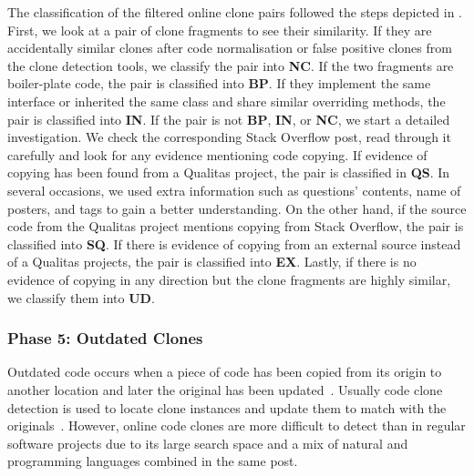 \documentclass[10pt,journal,compsoc]{IEEEtran}
\begin{document}
The classification of the filtered online clone pairs followed the steps
depicted in . First, we look at a pair of clone
fragments to see their similarity. If they are accidentally similar clones after
code normalisation or false positive clones from the clone detection tools, we
classify the pair into \textbf{NC}. If the two fragments are boiler-plate code,
the pair is classified into \textbf{BP}. If they implement the same interface or
inherited the same class and share similar overriding methods, the pair is
classified into \textbf{IN}. If the pair is not \textbf{BP}, \textbf{IN}, or
\textbf{NC}, we start a detailed investigation. We check the corresponding Stack
Overflow post, read through it carefully and look for any evidence mentioning
code copying. If evidence of copying has been found from a Qualitas project, the
pair is classified in \textbf{QS}. In several occasions, we used extra
information such as questions' contents, name of posters, and tags to gain a
better understanding. On the other hand, if the source code from the Qualitas
project mentions copying from Stack Overflow, the pair is classified into
\textbf{SQ}. If there is evidence of copying from an external source instead of
a Qualitas projects, the pair is classified into \textbf{EX}. Lastly, if there
is no evidence of copying in any direction but the clone fragments are highly
similar, we classify them into \textbf{UD}.

\subsubsection{Phase 5: Outdated Clones} Outdated code occurs when a piece of code
has been copied from its origin to another location and later the original has
been updated~\cite{Xia2014}. Usually code clone detection is used to locate
clone instances and update them to match with the originals~\cite{Bellon2007}.
However, online code clones are more difficult to detect than in regular
software projects due to its large search space and a mix of natural and
programming languages combined in the same post.
\end{document}
